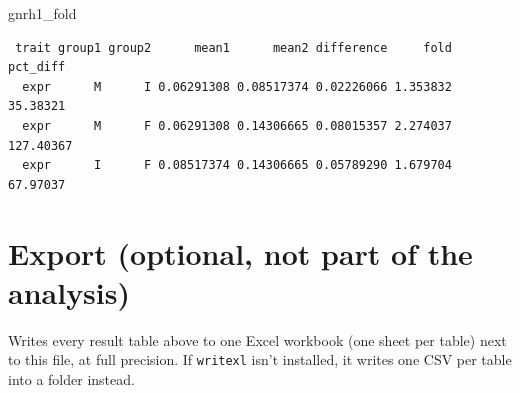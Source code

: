 \documentclass[
  landscape]{article}
\newenvironment{Shaded}{\begin{snugshade}}{\end{snugshade}}
\newcommand{\NormalTok}[1]{#1}
\begin{document}
\begin{Shaded}
\begin{Highlighting}[]
\NormalTok{gnrh1\_fold}
\end{Highlighting}
\end{Shaded}

\begin{verbatim}
 trait group1 group2      mean1      mean2 difference     fold  pct_diff
  expr      M      I 0.06291308 0.08517374 0.02226066 1.353832  35.38321
  expr      M      F 0.06291308 0.14306665 0.08015357 2.274037 127.40367
  expr      I      F 0.08517374 0.14306665 0.05789290 1.679704  67.97037
\end{verbatim}

\section{Export (optional, not part of the
analysis)}\label{export-optional-not-part-of-the-analysis}

Writes every result table above to one Excel workbook (one sheet per
table) next to this file, at full precision. If \texttt{writexl} isn't
installed, it writes one CSV per table into a folder instead.
\end{document}

